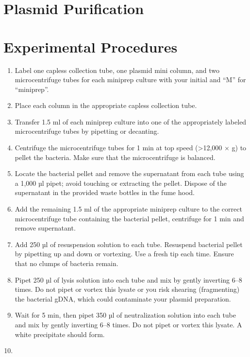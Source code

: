 \documentclass[]{book}
\providecommand{\tightlist}{%
  \setlength{\itemsep}{0pt}\setlength{\parskip}{0pt}}
\theoremstyle{definition}
\theoremstyle{definition}
\theoremstyle{definition}
\theoremstyle{remark}
\begin{document}
\section{Plasmid Purification}\label{plasmid-purification}

\section{Experimental Procedures}\label{experimental-procedures-15}

\begin{enumerate}
\def\labelenumi{\arabic{enumi}.}
\tightlist
\item
  Label one capless collection tube, one plasmid mini column, and two
  microcentrifuge tubes for each miniprep culture with your initial and
  ``M'' for ``miniprep''.
\item
  Place each column in the appropriate capless collection tube.
\item
  Transfer 1.5 ml of each miniprep culture into one of the appropriately
  labeled microcentrifuge tubes by pipetting or decanting.
\item
  Centrifuge the microcentrifuge tubes for 1 min at top speed
  (\textgreater{}12,000 × g) to pellet the bacteria. Make sure that the
  microcentrifuge is balanced.
\item
  Locate the bacterial pellet and remove the supernatant from each tube
  using a 1,000 µl pipet; avoid touching or extracting the pellet.
  Dispose of the supernatant in the provided waste bottles in the fume
  hood.
\item
  Add the remaining 1.5 ml of the appropriate miniprep culture to the
  correct microcentrifuge tube containing the bacterial pellet,
  centrifuge for 1 min and remove supernatant.
\item
  Add 250 µl of resuspension solution to each tube. Resuspend bacterial
  pellet by pipetting up and down or vortexing. Use a fresh tip each
  time. Ensure that no clumps of bacteria remain.
\item
  Pipet 250 µl of lysis solution into each tube and mix by gently
  inverting 6--8 times. Do not pipet or vortex this lysate or you risk
  shearing (fragmenting) the bacterial gDNA, which could contaminate
  your plasmid preparation.
\item
  Wait for 5 min, then pipet 350 µl of neutralization solution into each
  tube and mix by gently inverting 6--8 times. Do not pipet or vortex
  this lysate. A white precipitate should form.
\item

\end{enumerate}
\end{document}
